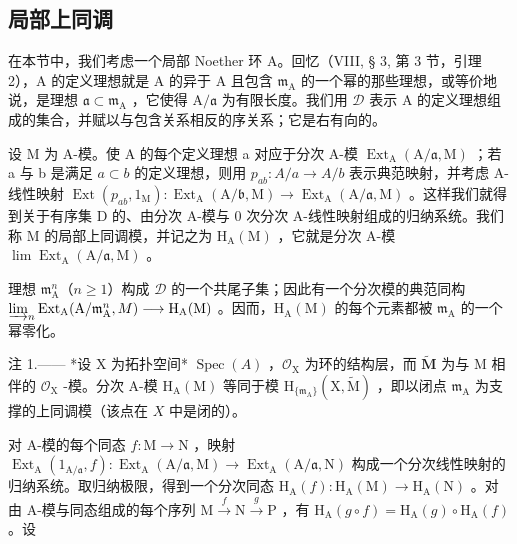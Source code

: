 \subsection{局部上同调}

在本节中，我们考虑一个局部 Noether 环 A。回忆（VIII, § 3, 第 3 节，引理 2），A 的定义理想就是 A 的异于 A 且包含 \(\mathfrak{m}_{\mathrm{A}}\) 的一个幂的那些理想，或等价地说，是理想 \(\mathfrak{a} \subset \mathfrak{m}_{\mathrm{A}}\) ，它使得 \(\mathrm{A}/\mathfrak{a}\) 为有限长度。我们用 \(\mathcal{D}\) 表示 \(\mathrm{A}\) 的定义理想组成的集合，并赋以与包含关系相反的序关系；它是右有向的。

设 M 为 A-模。使 A 的每个定义理想 a 对应于分次 A-模 \(\operatorname{Ext}_{\mathrm{A}}(\mathrm{A}/\mathfrak{a},\mathrm{M})\) ；若 a 与 b 是满足 \(a \subset b\) 的定义理想，则用 \(p_{ab}: A/a \to A/b\) 表示典范映射，并考虑 A-线性映射 \(\operatorname{Ext}(p_{ab},1_{\mathrm{M}}): \operatorname{Ext}_{\mathrm{A}}(\mathrm{A}/\mathfrak{b},\mathrm{M}) \longrightarrow \operatorname{Ext}_{\mathrm{A}}(\mathrm{A}/\mathfrak{a},\mathrm{M})\) 。这样我们就得到关于有序集 D 的、由分次 A-模与 0 次分次 A-线性映射组成的归纳系统。我们称 M 的局部上同调模，并记之为 \(\mathrm{H}_{\mathrm{A}}(\mathrm{M})\) ，它就是分次 A-模 \(\lim \operatorname{Ext}_{\mathrm{A}}(\mathrm{A}/\mathfrak{a},\mathrm{M})\) 。

理想 \(\mathfrak{m}_{\mathrm{A}}^{n}\)（\(n \geqslant 1\)）构成 \(\mathcal{D}\) 的一个共尾子集；因此有一个分次模的典范同构 \(\varinjlim_{n} \operatorname{Ext}_{\mathrm{A}}(\mathrm{A}/\mathfrak{m}_{\mathrm{A}}^{n}, M) \longrightarrow \mathrm{H}_{\mathrm{A}}(\mathrm{M})\) 。因而，\(\mathrm{H}_{\mathrm{A}}(\mathrm{M})\) 的每个元素都被 \(\mathfrak{m}_{\mathrm{A}}\) 的一个幂零化。

注 1.—— *设 X 为拓扑空间* \(\operatorname{Spec}(A)\) ，\(\mathcal{O}_{\mathrm{X}}\) 为环的结构层，而 \(\widetilde{\mathbf{M}}\) 为与 M 相伴的 \(\mathcal{O}_{\mathrm{X}}\) -模。分次 A-模 \(\mathrm{H}_{\mathrm{A}}(\mathrm{M})\) 等同于模 \(\mathrm{H}_{\{\mathfrak{m}_{\mathrm{A}}\}}(\mathrm{X},\widetilde{\mathrm{M}})\) ，即以闭点 \(\mathfrak{m}_{\mathrm{A}}\) 为支撑的上同调模（该点在 \(X\) 中是闭的）。

对 A-模的每个同态 \(f: \mathrm{M} \to \mathrm{N}\) ，映射 \(\operatorname{Ext}_{\mathrm{A}}(1_{\mathrm{A}/\mathfrak{a}}, f): \operatorname{Ext}_{\mathrm{A}}(\mathrm{A}/\mathfrak{a}, \mathrm{M}) \longrightarrow \operatorname{Ext}_{\mathrm{A}}(\mathrm{A}/\mathfrak{a}, \mathrm{N})\) 构成一个分次线性映射的归纳系统。取归纳极限，得到一个分次同态 \(\mathrm{H}_{\mathrm{A}}(f): \mathrm{H}_{\mathrm{A}}(\mathrm{M}) \to \mathrm{H}_{\mathrm{A}}(\mathrm{N})\) 。对由 A-模与同态组成的每个序列 \(\mathrm{M} \xrightarrow{f} \mathrm{N} \xrightarrow{g} \mathrm{P}\) ，有 \(\mathrm{H}_{\mathrm{A}}(g \circ f) = \mathrm{H}_{\mathrm{A}}(g) \circ \mathrm{H}_{\mathrm{A}}(f)\) 。设

